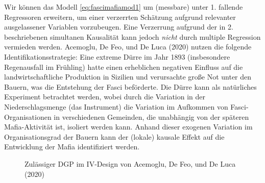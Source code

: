 \documentclass[
  a4paper,
  DIV=11,
  oneside]{scrreprt}
\begin{document}
Wir können das Modell \eqref{eq:fascimafiamod1} um (messbare) unter 1.
fallende Regressoren erweitern, um einer verzerrten Schätzung aufgrund
relevanter ausgelassener Variablen vorzubeugen. Eine Verzerrung aufgrund
der in 2. beschriebenen simultanen Kausalität kann jedoch \emph{nicht}
durch multiple Regression vermieden werden. Acemoglu, De Feo, und De
Luca (2020) nutzen die folgende Identifikationsstrategie: Eine extreme
Dürre im Jahr 1893 (insbesondere Regenausfall im Frühling) hatte einen
erheblichen negativen Einfluss auf die landwirtschaftliche Produktion in
Sizilien und verursachte große Not unter den Bauern, was die Entstehung
der Fasci beförderte. Die Dürre kann als natürliches Experiment
betrachtet werden, wobei durch die Variation in der Niederschlagsmenge
(das Instrument) die Variation im Aufkommen von Fasci-Organisationen in
verschiedenen Gemeinden, die unabhängig von der späteren Mafia-Aktivität
ist, isoliert werden kann. Anhand dieser exogenen Variation im
Organisationsgrad der Bauern kann der (lokale) kausale Effekt auf die
Entwicklung der Mafia identifiziert werden.

\begin{figure}[t]


\caption{\label{fig-ADDdag}Zulässiger DGP im IV-Design von Acemoglu, De
Feo, und De Luca (2020)}

\end{figure}%
\end{document}
